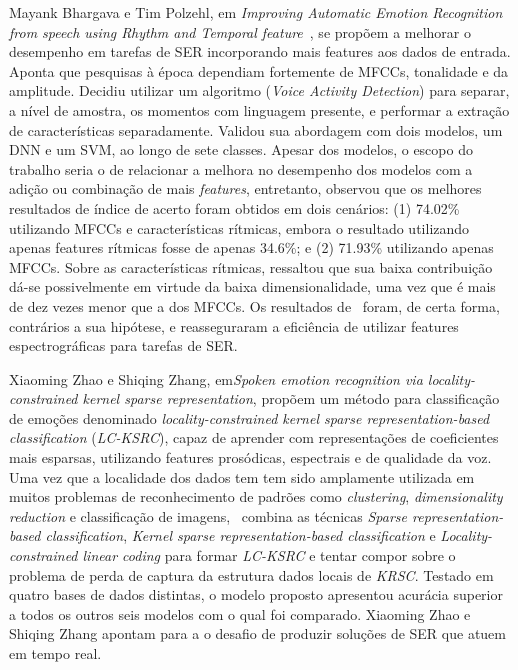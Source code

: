 Mayank Bhargava e Tim Polzehl, em \textit{Improving Automatic Emotion Recognition from speech using Rhythm and Temporal feature}~\cite{11}, se propõem a melhorar o desempenho em tarefas de \acrshort{SER} incorporando mais features aos dados de entrada. Aponta que pesquisas à época dependiam fortemente de \acrshort{MFCC}s, tonalidade e da amplitude. Decidiu utilizar um algoritmo (\textit{Voice Activity Detection}) para separar, a nível de amostra, os momentos com linguagem presente, e performar a extração de características separadamente. Validou sua abordagem com dois modelos, um \acrshort{DNN} e um \acrshort{SVM}, ao longo de sete classes. Apesar dos modelos, o escopo do trabalho seria o de relacionar a melhora no desempenho dos modelos com a adição ou combinação de mais \textit{features}, entretanto, observou que os melhores resultados de índice de acerto foram obtidos em dois cenários: (1) 74.02\% utilizando \acrshort{MFCC}s e características rítmicas, embora o resultado utilizando apenas features rítmicas fosse de apenas 34.6\%; e (2) 71.93\% utilizando apenas \acrshort{MFCC}s. Sobre as características rítmicas, ressaltou que sua baixa contribuição dá-se possivelmente em virtude da baixa dimensionalidade, uma vez que é mais de dez vezes menor que a dos \acrshort{MFCC}s. Os resultados de~\cite{11} foram, de certa forma, contrários a sua hipótese, e reasseguraram a eficiência de utilizar features espectrográficas para tarefas de \acrshort{SER}.

Xiaoming Zhao e Shiqing Zhang, em\textit{Spoken emotion recognition via locality-constrained kernel sparse representation}\cite{32.31}, propõem um método para classificação de emoções denominado \textit{locality-constrained kernel sparse representation-based classification} (\textit{LC-KSRC}), capaz de aprender com representações de coeficientes mais esparsas, utilizando features prosódicas, espectrais e de qualidade da voz. Uma vez que a localidade dos dados tem tem sido amplamente utilizada em muitos problemas de reconhecimento de padrões como \textit{clustering}, \textit{dimensionality reduction} e classificação de imagens,~\cite{32.31} combina as técnicas \textit{Sparse representation-based classification}, \textit{Kernel sparse representation-based classification} e \textit{Locality-constrained linear coding} para formar \textit{LC-KSRC} e tentar compor sobre o problema de perda de captura da estrutura dados locais de \textit{KRSC}. Testado em quatro bases de dados distintas, o modelo proposto apresentou acurácia superior a todos os outros seis modelos com o qual foi comparado. Xiaoming Zhao e Shiqing Zhang apontam para a o desafio de produzir soluções de \acrshort{SER} que atuem em tempo real.

